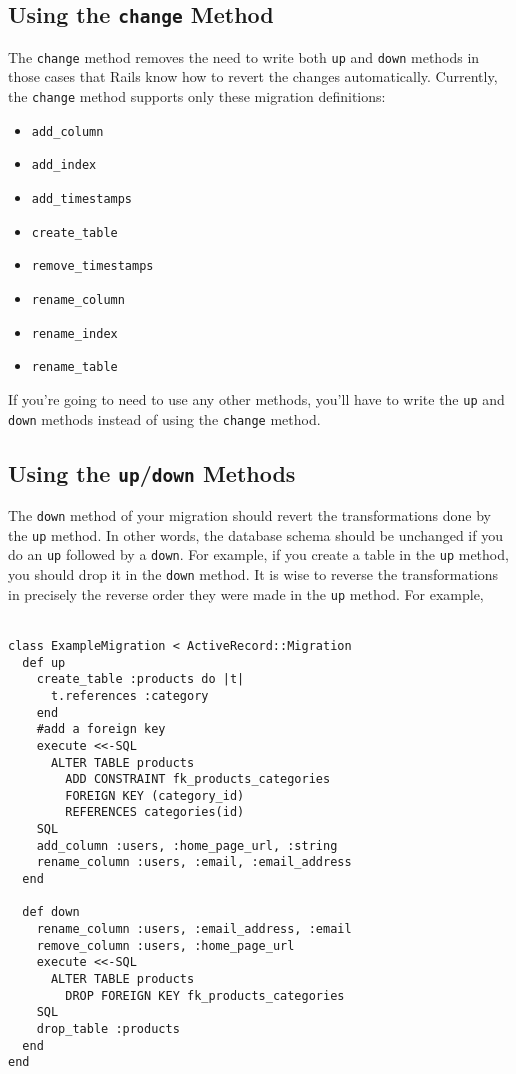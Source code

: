 \documentclass[10pt]{book}
\begin{document}
\subsection{ Using the \texttt{change} Method}

The \texttt{change} method removes the need to write both \texttt{up} and \texttt{down} methods in those cases that Rails know how to revert the changes automatically. Currently, the \texttt{change} method supports only these migration definitions:
\begin{itemize}
	\item \texttt{add\_column}
	\item \texttt{add\_index}
	\item \texttt{add\_timestamps}
	\item \texttt{create\_table}
	\item \texttt{remove\_timestamps}
	\item \texttt{rename\_column}
	\item \texttt{rename\_index}
	\item \texttt{rename\_table}
\end{itemize}

If you’re going to need to use any other methods, you’ll have to write the \texttt{up} and \texttt{down} methods instead of using the \texttt{change} method.

\subsection{ Using the \texttt{up}/\texttt{down} Methods}

The \texttt{down} method of your migration should revert the transformations done by the \texttt{up} method. In other words, the database schema should be unchanged if you do an \texttt{up} followed by a \texttt{down}. For example, if you create a table in the \texttt{up} method, you should drop it in the \texttt{down} method. It is wise to reverse the transformations in precisely the reverse order they were made in the \texttt{up} method. For example,
\\ \\
\begin{minipage}{\textwidth}
\begin{verbatim}
class ExampleMigration < ActiveRecord::Migration
  def up
    create_table :products do |t|
      t.references :category
    end
    #add a foreign key
    execute <<-SQL
      ALTER TABLE products
        ADD CONSTRAINT fk_products_categories
        FOREIGN KEY (category_id)
        REFERENCES categories(id)
    SQL
    add_column :users, :home_page_url, :string
    rename_column :users, :email, :email_address
  end
 
  def down
    rename_column :users, :email_address, :email
    remove_column :users, :home_page_url
    execute <<-SQL
      ALTER TABLE products
        DROP FOREIGN KEY fk_products_categories
    SQL
    drop_table :products
  end
end
\end{verbatim}
\end{minipage}
\\ \\
\end{document}
